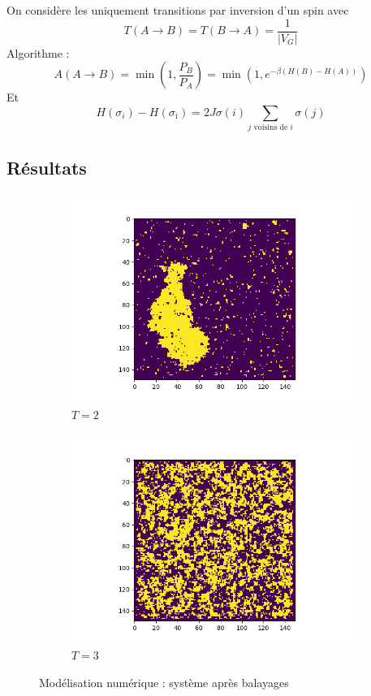 \documentclass[french]{beamer}
\begin{document}
\begin{frame}
	On considère les uniquement transitions par inversion d'un spin avec \[T(A \to B) = T(B \to A) = \frac{1}{\left|V_G\right|}\]
	Algorithme  :
	\[
	A(A \to B) = \min\left(1, \frac{P_B}{P_A}\right) = \min\left(1, e^{-\beta(H(B) - H(A))}\right)
	\]
	Et
	\[
	H(\sigma_i) - H(\sigma_{\overline{\imath}}) = 2J\sigma(i) \sum_\text{$j$ voisins de $i$} \sigma(j)
	\]
\end{frame}

%
\subsection{Résultats}
%

\begin{frame}
\begin{figure}
	\centering
	\begin{subfigure}{0.5\textwidth}
		\centering
		\includegraphics[height=0.55\textheight]{assets/T2}
		\caption{$T = 2$}
		\label{fig:t2}
	\end{subfigure}%
	\begin{subfigure}{0.5\textwidth}
	\centering
	\includegraphics[height=0.55\textheight]{assets/T3}
	\caption{$T = 3$}
	\label{fig:t3}
\end{subfigure}%
\caption{Modélisation numérique : système après  balayages}
\end{figure}


\end{frame}
\end{document}
